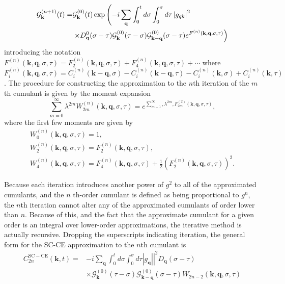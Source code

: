 \begin{align}
    \mathcal{G}_{\mathbf{k}}^{(n+1)}(t)= & \mathcal{G}_{\mathbf{k}}^{(0)}(t) \exp \left(-i \sum_{\mathbf{q}} \int_0^t d \sigma \int_0^\sigma d \tau\left|g_{q k}\right|^2\right. \\
& \left.\times D_{\mathbf{q}}^0(\sigma-\tau) \mathcal{G}_{\mathbf{k}}^{(0)}(\tau-\sigma) \mathcal{G}_{\mathbf{k}-\mathbf{q}}^{(0)}(\sigma-\tau) e^{F^{(n)}(\mathbf{k}, \mathbf{q}, \sigma, \tau)}\right) \notag
\end{align}
introducing the notation $F^{(n)}(\mathbf{k}, \mathbf{q}, \sigma, \tau) = F_2^{(n)}(\mathbf{k}, \mathbf{q}, \sigma, \tau)+F_4^{(n)}(\mathbf{k}, \mathbf{q}, \sigma, \tau)+\cdots$ where $F_i^{(n)}(\mathbf{k}, \mathbf{q}, \sigma, \tau) = C_i^{(n)}(\mathbf{k}-\mathbf{q}, \sigma)-C_i^{(n)}(\mathbf{k}-\mathbf{q}, \tau) -C_i^{(n)}(\mathbf{k}, \sigma)+C_i^{(n)}(\mathbf{k}, \tau)$.
The procedure for constructing the approximation to the $n$th iteration of the $m$ th cumulant is given by the moment expansion
$$
\sum_{m=0}^{\infty} \lambda^{2 m} W_{2 m}^{(n)}(\mathbf{k}, \mathbf{q}, \sigma, \tau)=e^{\sum_{m-1}^{\infty}, \lambda^{2 m}, F_{2 m}^{(2)}(\mathbf{k}, \mathbf{q}, \sigma, \tau)},
$$
where the first few moments are given by
$$
\begin{gathered}
W_0^{(n)}(\mathbf{k}, \mathbf{q}, \sigma, \tau)=1, \\
W_2^{(n)}(\mathbf{k}, \mathbf{q}, \sigma, \tau)=F_2^{(n)}(\mathbf{k}, \mathbf{q}, \sigma, \tau), \\
W_4^{(n)}(\mathbf{k}, \mathbf{q}, \sigma, \tau)=F_4^{(n)}(\mathbf{k}, \mathbf{q}, \sigma, \tau)+\frac{1}{2}\left(F_2^{(n)}(\mathbf{k}, \mathbf{q}, \sigma, \tau)\right)^2 .
\end{gathered}
$$

Because each iteration introduces another power of $g^2$ to all of the approximated cumulants, and the $n$ th-order cumulant is defined as being proportional to $g^n$, the $n$th iteration cannot alter any of the approximated cumulants of order lower than $n$. Because of this, and the fact that the approximate cumulant for a given order is an integral over lower-order approximations, the iterative method is actually recursive. Dropping the superscripts indicating iteration, the general form for the SC-CE approximation to the $n$th cumulant is
$$
\begin{aligned}
C_{2 n}^{\mathrm{SC}-\mathrm{CE}}(\mathbf{k}, t)= & -\left.i \sum_{\mathbf{q}} \int_0^t d \sigma \int_0^\sigma d \tau\left|g_{\mathbf{q}}\right|\right|^2 D_{\mathbf{q}}(\sigma-\tau) \\
& \times \mathcal{G}_{\mathbf{k}}^{(0)}(\tau-\sigma) \mathcal{G}_{\mathbf{k}-\mathbf{q}}^{(0)}(\sigma-\tau) W_{2 n-2}(\mathbf{k}, \mathbf{q}, \sigma, \tau)
\end{aligned}
$$

